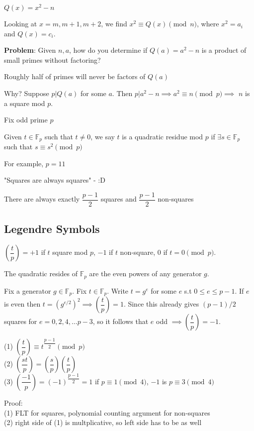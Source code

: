 \documentclass[10pt]{article}
\newcommand{\F}{\mathbb{F}}
\begin{document}
$Q(x) = x^2 - n$

Looking at $x = m, m+1, m+2$, we find $x^2 \equiv Q(x) \pmod{n}$, where $x^2 = a_i$ and $Q(x) = c_i$.

\textbf{Problem}: Given $n, a$, how do you determine if $Q(a) = a^2 - n$ is a product of small primes without factoring?


\begin{rmk}
    Roughly half of primes will never be factors of $Q(a)$
\end{rmk}
Why? Suppose $p | Q(a)$ for some $a$. Then $p | a^2 - n \implies a^2 \equiv n \pmod{p} \implies$ $n$ is a square mod $p$.

Fix odd prime $p$

\begin{defn}
    Given $t\in \F_p$ such that $t\neq 0$, we say $t$ is a quadratic residue mod $p$ if $\exists s \in \F_p$ such that $s\equiv s^2 \pmod{p}$
\end{defn}
For example, $p=11$

"Squares are always squares" - :D

There are always exactly $\dfrac{p-1}{2}$ squares and $\dfrac{p-1}{2}$ non-squares 

\subsection{Legendre Symbols}
\begin{defn}
    $\left(\dfrac{t}{p}\right) = +1$ if $t$ square mod $p$, $-1$ if $t$ non-square, $0$ if $t = 0 \pmod{p}$.
\end{defn}

\begin{rmk}
    The quadratic resides of $\F_p$ are the even powers of any generator $g$.
\end{rmk}
Fix a generator $g\in \F_p$. Fix $t\in \F_p$. Write $t = g^e$ for some $e$ s.t $0\leq e \leq p-1$. If $e$ is even then $t = (g^{e/2})^2 \implies \left(\dfrac{t}{p}\right) = 1$. Since this already gives $(p-1)/2$ squares for $e = 0, 2, 4, \ldots p-3$, so it follows that $e$ odd $\implies \left(\dfrac{t}{p}\right) = -1$.

\begin{defn}
    (1) $\left(\dfrac{t}{p}\right) \equiv t^{\dfrac{p-1}{2}} \pmod{p}$\\
    (2) $\left(\dfrac{st}{p}\right) = \left(\dfrac{s}{p}\right)\left(\dfrac{t}{p}\right)$\\
    (3) $\left(\dfrac{-1}{p}\right) = (-1)^{\dfrac{p-1}{2}} = 1$ if $p\equiv 1\pmod{4}$, $-1$ is $p\equiv 3\pmod{4}$
\end{defn}
Proof:\\ 
(1) FLT for squares, polynomial counting argument for non-squares\\
(2) right side of (1) is multplicative, so left side has to be as well
\end{document}
